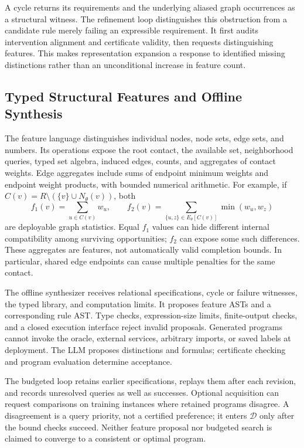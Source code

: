 A cycle returns its requirements and the underlying aliased graph
occurrences as a structural witness. The refinement loop distinguishes
this obstruction from a candidate rule merely failing an expressible
requirement. It first audits intervention alignment and certificate
validity, then requests distinguishing features. This makes representation
expansion a response to identified missing distinctions rather than an
unconditional increase in feature count.

\subsection{Typed Structural Features and Offline Synthesis}
\label{sec:method:typed}

The feature language distinguishes individual nodes, node sets, edge sets,
and numbers. Its operations expose the root contact, the available set,
neighborhood queries, typed set algebra, induced edges, counts, and
aggregates of contact weights. Edge aggregates include sums of endpoint
minimum weights and endpoint weight products, with bounded numerical arithmetic.
For example, if
$C(v)=R\setminus(\{v\}\cup N_\theta(v))$, both
\begin{equation}
 f_1(v)=\sum_{u\in C(v)}w_u,\qquad
 f_2(v)=\sum_{\{u,z\}\in E_\theta[C(v)]}\min(w_u,w_z)
\end{equation}
are deployable graph statistics. Equal $f_1$ values can hide different
internal compatibility among surviving opportunities; $f_2$ can expose
some such differences. These aggregates are features, not automatically
valid completion bounds. In particular, shared edge endpoints can cause
multiple penalties for the same contact.

The offline synthesizer receives relational specifications, cycle or
failure witnesses, the typed library, and computation limits. It proposes
feature ASTs and a corresponding rule AST. Type checks, expression-size
limits, finite-output checks, and a closed execution interface reject
invalid proposals. Generated programs cannot invoke the oracle, external
services, arbitrary imports, or saved labels at deployment.
The LLM proposes distinctions and formulas; certificate checking and
program evaluation determine acceptance.

The budgeted loop retains earlier specifications, replays them after each
revision, and records unresolved queries as well as successes. Optional
acquisition can request comparisons on training instances where retained
programs disagree. A disagreement is a query priority, not a certified
preference; it enters $\mathcal{D}$ only after the bound checks succeed.
Neither feature proposal nor budgeted search is claimed to converge to
a consistent or optimal program.


